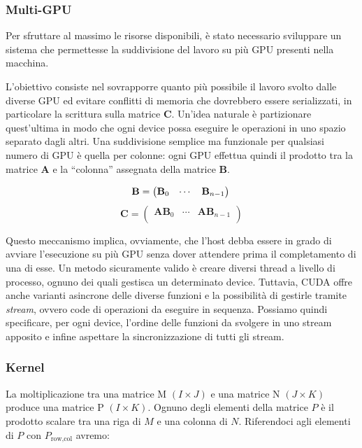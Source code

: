 \documentclass[a4paper]{article}
\begin{document}
\subsubsection{Multi-GPU}
Per sfruttare al massimo le risorse disponibili, è stato necessario sviluppare un sistema che permettesse la suddivisione del lavoro su più GPU presenti nella macchina.

L'obiettivo consiste nel sovrapporre quanto più possibile il lavoro svolto dalle diverse GPU ed evitare conflitti di memoria che dovrebbero essere serializzati, in particolare la scrittura sulla matrice $\mathbf{C}$. Un'idea naturale è partizionare quest'ultima in modo che ogni device possa eseguire le operazioni in uno spazio separato dagli altri.
Una suddivisione semplice ma funzionale per qualsiasi numero di GPU è quella per colonne: ogni GPU effettua quindi il prodotto tra la matrice $\mathbf{A}$ e la ``colonna'' assegnata della matrice $\mathbf{B}$.

$$
    \mathbf{B}=
    \begin{pmatrix}
        \mathbf{B}_{0} & \cdots & \mathbf{B}_{n - 1} \\
    \end{pmatrix}\\
$$
$$
    \mathbf{C}=
    \begin{pmatrix}
        \mathbf{A}\mathbf{B}_0 & \cdots & \mathbf{A}\mathbf{B}_{n-1} \\
    \end{pmatrix}
$$

Questo meccanismo implica, ovviamente, che l'host debba essere in grado di avviare l'esecuzione su più GPU senza dover attendere prima il completamento di una di esse.
Un metodo sicuramente valido è creare diversi thread a livello di processo, ognuno dei quali gestisca un determinato device.
Tuttavia, CUDA offre anche varianti asincrone delle diverse funzioni e la possibilità di gestirle tramite \textit{stream}, ovvero code di operazioni da eseguire in sequenza. Possiamo quindi specificare, per ogni device, l'ordine delle funzioni da svolgere in uno stream apposito e infine aspettare la sincronizzazione di tutti gli stream.

\subsubsection{Kernel}

La moltiplicazione tra una matrice M $(I\times{J})$ e una matrice N $(J\times{K})$ produce una matrice P $(I\times{K})$. Ognuno degli elementi della matrice $P$ è il prodotto scalare tra una riga di $M$ e una colonna di $N$. Riferendoci agli elementi di $P$ con $P_{\text{row}, \text{col}}$ avremo:
\end{document}
